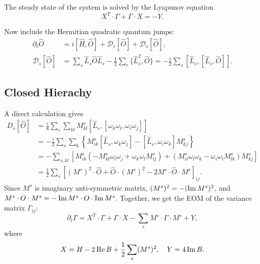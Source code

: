 \documentclass{SciPost}
\begin{document}
The steady state of the system is solved by the Lyapunov equation
\begin{equation}
	X^T\cdot\Gamma + \Gamma \cdot X = - Y.
\end{equation}


Now include the Hermitian quadratic quantum jumps:
\begin{equation}
\begin{aligned}
	\partial_t \hat O &= i[\hat H, \hat O] + \mathcal D_r[\hat O] + \mathcal D_s[\hat O], \\
	\mathcal D_s[\hat O] 
	&= \sum_s \hat L_s \hat O\hat L_s - \frac{1}{2} \sum_r\{\hat L_s^2, \hat O \}
	= -\frac{1}{2} \sum_s [\hat L_s,[\hat L_s,\hat O]].
\end{aligned}
\end{equation}



\subsection{Closed Hierachy}
A direct calculation gives
\begin{equation}
\begin{aligned}
	D_s[\hat O]
	&= \frac{i}{8} \sum_s \sum_{kl} M^s_{kl} [\hat L_s,[\omega_k \omega_l, \omega_i \omega_j]] \\
	&= -\frac{i}{2}\sum_s \sum_{k} \left\{ M^s_{ik}[\hat L_s,\omega_k \omega_j]-[\hat L_s,\omega_i \omega_k]M^s_{kj} \right\} \\
	&= -\sum_{s,kl} \left[ M^s_{ik}(-M^s_{kl}\omega_l\omega_j+\omega_k\omega_l M^s_{lj})+(M^s_{il}\omega_l\omega_k-\omega_i\omega_l M^s_{lk})M^s_{kj} \right] \\
	&= \frac{1}{2}\sum_s \left[(M^s)^2 \cdot \hat O + \hat O\cdot(M^s)^2 -2 M^s \cdot\hat O\cdot M^s\right]_{ij}.
\end{aligned}
\end{equation}
Since $M^s$ is imaginary anti-symmetric matrix, $(M^s)^2 = - (\operatorname{Im} M^s)^2$, and $M^s \cdot O \cdot M^s = - \operatorname{Im} M^s \cdot O \cdot \operatorname{Im} M^s$.
Together, we get the EOM of the variance matrix $\Gamma_{ij}$:
\begin{equation}
	\partial_t \Gamma = X^T\cdot\Gamma + \Gamma \cdot X - \sum_s M^s \cdot \Gamma\cdot M^s + Y,
\end{equation}
where
\begin{equation}
\begin{aligned}
	X = H - 2\operatorname{Re}{B} + \frac{1}{2} \sum_s (M^s)^2, \quad
	Y = 4\operatorname{Im}{B}.
\end{aligned}
\end{equation}
\end{document}
